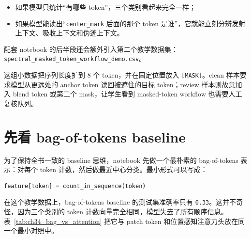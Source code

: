 \begin{itemize}
    \item 如果模型只统计“有哪些 token”，三个类别看起来完全一样；
    \item 如果模型能读出“\texttt{center\_mark} 后面的那个 token 是谁”，它就能立刻分辨发射上下文、吸收上下文和伪迹上下文。
\end{itemize}

配套 notebook 的后半段还会额外引入第二个教学数据集：\nolinkurl{spectral_masked_token_workflow_demo.csv}。

这组小数据把序列长度扩到 8 个 token，并在固定位置放入 \texttt{[MASK]}。clean 样本要求模型从更远处的 anchor token 读回被遮住的目标 token；review 样本则故意加入 blend token 或第二个 mask，让学生看到 masked-token workflow 也需要人工复核队列。

\section{先看 bag-of-tokens baseline}

为了保持全书一致的 baseline 思维，notebook 先做一个最朴素的 bag-of-tokens 表示：对每个 token 计数，然后做最近中心分类。最小形式可以写成：

\begin{examplebox}
\begin{lstlisting}[style=pythonstyle]
feature[token] = count_in_sequence(token)
\end{lstlisting}
\end{examplebox}

在这个教学数据上，bag-of-tokens baseline 的测试集准确率只有 \texttt{0.33}。这并不奇怪，因为三个类别的 token 计数向量完全相同，模型失去了所有顺序信息。表~\ref{tab:ch34_bag_vs_attention} 把它与 patch token 和位置感知注意力头放在同一个最小对照中。

\begin{table}[htbp]
\centering
\small
{}
\caption{本章教学 notebook 中的三个最小对照组。这里的重点不是追求高分，而是直接暴露顺序信息、局部 patch 化和动态读出在序列建模中的不同作用。}
\label{tab:ch34_bag_vs_attention}
\end{table}


